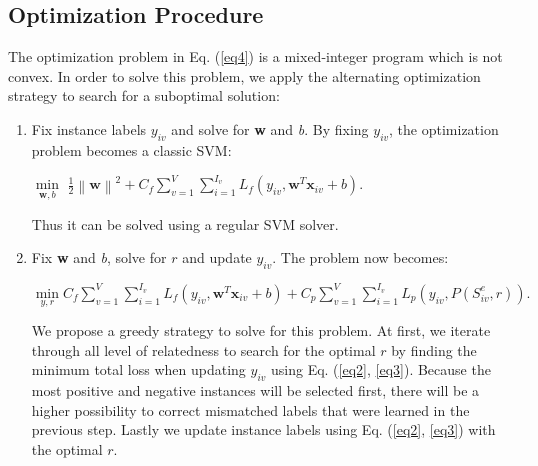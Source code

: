 \subsection{Optimization Procedure} 
The optimization problem in Eq. (\ref{eq4}) is a mixed-integer program which is not convex. In order to solve this problem, we apply the alternating optimization strategy to search for a suboptimal solution:
\begin{enumerate}
	\item{} Fix instance labels $y_{iv}$ and solve for \textbf{w} and \textit{b}. By fixing $y_{iv}$, the optimization problem becomes a classic SVM:
	
	$\min\limits_{\textbf{w},b}$ $\frac{1}{2} \left \| \textbf{w} \right \|^{2} + C_{f} \sum_{v=1}^{V}\sum_{i=1}^{I_{v}}L_{f}\left ( y_{iv}, \textbf{w}^{T}\textbf{x}_{iv}+b \right )$. 
	
	Thus it can be solved using a regular SVM solver.
	
	\item{} Fix \textbf{w} and \textit{b}, solve for $r$ and update $y_{iv}$. The problem now becomes: 
	
	$\min\limits_{y,r} C_{f} \sum_{v=1}^{V}\sum_{i=1}^{I_{v}}L_{f}\left ( y_{iv}, \textbf{w}^{T}\textbf{x}_{iv}+b \right ) 
	+ C_{p} \sum_{v=1}^{V}\sum_{i=1}^{I_{v}}L_{p}\left ( y_{iv}, P(S_{iv}^{e},r) \right ).$
	
	We propose a greedy strategy to solve for this problem. At first, we iterate through all level of relatedness to search for the optimal $r$ by finding the minimum total loss when updating $y_{iv}$ using Eq. (\ref{eq2}, \ref{eq3}). Because the most positive and negative instances will be selected first, there will be a higher possibility to correct mismatched labels that were learned in the previous step. Lastly we update instance labels using Eq. (\ref{eq2}, \ref{eq3}) with the optimal $r$. 
	
\end{enumerate}

